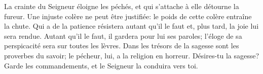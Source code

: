 La crainte du Seigneur éloigne les péchés,
	et qui s’attache à elle détourne la fureur.
Une injuste colère ne peut être justifiée:
	le poids de cette colère entraîne la chute.
Qui a de la patience résistera autant qu’il le faut
	et, plus tard, la joie lui sera rendue.
Autant qu’il le faut, il gardera pour lui ses paroles;
	l’éloge de sa perspicacité sera sur toutes les lèvres.
Dans les trésors de la sagesse sont les proverbes du savoir;
	le pécheur, lui, a la religion en horreur.
Désires-tu la sagesse?
	Garde les commandements, et le Seigneur la conduira vers toi.
